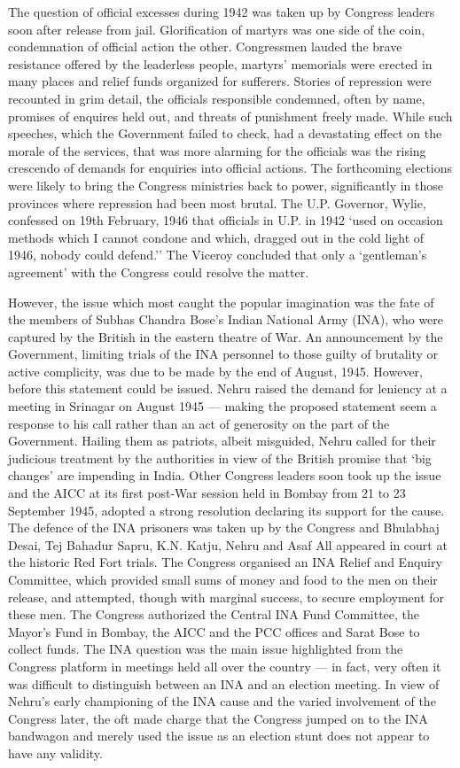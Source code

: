The question of official excesses during 1942 was taken up by Congress leaders soon after release from jail. Glorification of martyrs was one side of the coin, condemnation of official action the other. Congressmen lauded the brave resistance offered by the leaderless people, martyrs' memorials were erected in many places and relief funds organized for sufferers. Stories of repression were recounted in grim detail, the officials responsible condemned, often by name, promises of enquires held out, and threats of punishment freely made. While such speeches, which the Government failed to check, had a devastating effect on the morale of the services, that was more alarming for the officials was the rising crescendo of demands for enquiries into official actions. The forthcoming elections were likely to bring the Congress ministries back to power, significantly in those provinces where repression had been most brutal. The U.P. Governor, Wylie, confessed on 19th February, 1946 that officials in U.P. in 1942 `used on occasion methods which I cannot condone and which, dragged out in the cold light of 1946, nobody could defend.'' The Viceroy concluded that only a `gentleman's agreement' with the Congress could resolve the matter. 

However, the issue which most caught the popular imagination was the fate of the members of Subhas Chandra Bose's Indian National Army (INA), who were captured by the British in the eastern theatre of War. An announcement by the Government, limiting trials of the INA personnel to those guilty of brutality or active complicity, was due to be made by the end of August, 1945. However, before this statement could be issued. Nehru raised the demand for leniency at a meeting in Srinagar on August 1945 --- making the proposed statement seem a response to his call rather than an act of generosity on the part of the Government. Hailing them as patriots, albeit misguided, Nehru called for their judicious treatment by the authorities in view of the British promise that `big changes' are impending in India. Other Congress leaders soon took up the issue and the AICC at its first post-War session held in Bombay from 21 to 23 September 1945, adopted a strong resolution declaring its support for the cause. The defence of the INA prisoners was taken up by the Congress and Bhulabhaj Desai, Tej Bahadur Sapru, K.N. Katju, Nehru and Asaf All appeared in court at the historic Red Fort trials. The Congress organised an INA Relief and Enquiry Committee, which provided small sums of money and food to the men on their release, and attempted, though with marginal success, to secure employment for these men. The Congress authorized the Central INA Fund Committee, the Mayor's Fund in Bombay, the AICC and the PCC offices and Sarat Bose to collect funds. The INA question was the main issue highlighted from the Congress platform in meetings held all over the country --- in fact, very often it was difficult to distinguish between an INA and an election meeting. In view of Nehru's early championing of the INA cause and the varied involvement of the Congress later, the oft made charge that the Congress jumped on to the INA bandwagon and merely used the issue as an election stunt does not appear to have any validity. 

